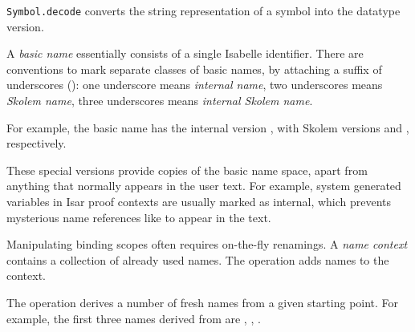 \begin{isabellebody}
\begin{isamarkuptext}
\begin{description}
  \item \verb|Symbol.decode| converts the string representation of a
  symbol into the datatype version.

  \end{description}%
\end{isamarkuptext}%
\isamarkuptrue%
%
\endisatagmlref
{\isafoldmlref}%
%
\isadelimmlref
%
\endisadelimmlref
%
\isamarkuptrue%
%
\begin{isamarkuptext}%
A \emph{basic name} essentially consists of a single Isabelle
  identifier.  There are conventions to mark separate classes of basic
  names, by attaching a suffix of underscores (\isa{{\isacharunderscore}}): one
  underscore means \emph{internal name}, two underscores means
  \emph{Skolem name}, three underscores means \emph{internal Skolem
  name}.

  For example, the basic name  has the internal version
  , with Skolem versions  and , respectively.

  These special versions provide copies of the basic name space, apart
  from anything that normally appears in the user text.  For example,
  system generated variables in Isar proof contexts are usually marked
  as internal, which prevents mysterious name references like  to appear in the text.

  \medskip Manipulating binding scopes often requires on-the-fly
  renamings.  A \emph{name context} contains a collection of already
  used names.  The  operation adds names to the
  context.

  The  operation derives a number of fresh names from
  a given starting point.  For example, the first three names derived
  from  are , , .


\end{isamarkuptext}
\end{isabellebody}
